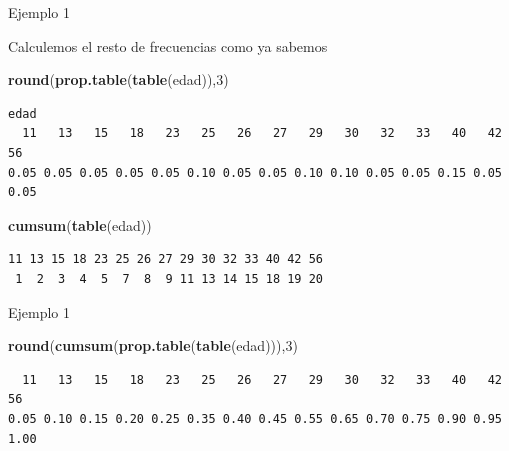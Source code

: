 \documentclass[
  ignorenonframetext,
]{beamer}
\newenvironment{Shaded}{\begin{snugshade}}{\end{snugshade}}
\newcommand{\DecValTok}[1]{\textcolor[rgb]{0.00,0.00,0.81}{#1}}
\newcommand{\KeywordTok}[1]{\textcolor[rgb]{0.13,0.29,0.53}{\textbf{#1}}}
\newcommand{\NormalTok}[1]{#1}
\begin{document}
\begin{frame}[fragile]{Ejemplo 1}
\protect\hypertarget{ejemplo-1-1}{}

Calculemos el resto de frecuencias como ya sabemos

\begin{Shaded}
\begin{Highlighting}[]
\KeywordTok{round}\NormalTok{(}\KeywordTok{prop.table}\NormalTok{(}\KeywordTok{table}\NormalTok{(edad)),}\DecValTok{3}\NormalTok{)}
\end{Highlighting}
\end{Shaded}

\begin{verbatim}
edad
  11   13   15   18   23   25   26   27   29   30   32   33   40   42   56 
0.05 0.05 0.05 0.05 0.05 0.10 0.05 0.05 0.10 0.10 0.05 0.05 0.15 0.05 0.05 
\end{verbatim}

\begin{Shaded}
\begin{Highlighting}[]
\KeywordTok{cumsum}\NormalTok{(}\KeywordTok{table}\NormalTok{(edad))}
\end{Highlighting}
\end{Shaded}

\begin{verbatim}
11 13 15 18 23 25 26 27 29 30 32 33 40 42 56 
 1  2  3  4  5  7  8  9 11 13 14 15 18 19 20 
\end{verbatim}

\end{frame}

\begin{frame}[fragile]{Ejemplo 1}
\protect\hypertarget{ejemplo-1-2}{}

\begin{Shaded}
\begin{Highlighting}[]
\KeywordTok{round}\NormalTok{(}\KeywordTok{cumsum}\NormalTok{(}\KeywordTok{prop.table}\NormalTok{(}\KeywordTok{table}\NormalTok{(edad))),}\DecValTok{3}\NormalTok{)}
\end{Highlighting}
\end{Shaded}

\begin{verbatim}
  11   13   15   18   23   25   26   27   29   30   32   33   40   42   56 
0.05 0.10 0.15 0.20 0.25 0.35 0.40 0.45 0.55 0.65 0.70 0.75 0.90 0.95 1.00 
\end{verbatim}

\end{frame}
\end{document}
